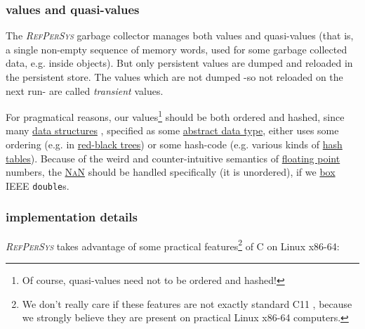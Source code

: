 \documentclass[11pt,a4paper,svgnames]{article}
\newcommand{\RefPerSys}{{\textit{\textsc{RefPerSys}}}}
\begin{document}
\medskip

\subsubsection{values and quasi-values}
\label{subsubsec:values-quasi}

The {\RefPerSys} garbage collector manages both values and
quasi-values (that is, a single non-empty sequence of memory words,
used for some garbage collected data, e.g. inside objects). But only
persistent values are dumped and reloaded in the persistent store.
The values which are not dumped -so not reloaded on the next run- are
called \emph{transient} values.

  For pragmatical reasons, our values\footnote{Of course, quasi-values
  need not to be ordered and hashed!} should be both ordered and
  hashed, since many
  \href{https://en.wikipedia.org/wiki/Data\_structure}{data
    structures} \cite{cormen:2009:introduction}, specified as some
  \href{https://en.wikipedia.org/wiki/Abstract_data_type}{abstract
    data type}, either uses some ordering
  (e.g. in \href{https://en.wikipedia.org/wiki/Red-black_tree}{red-black
    trees}) or some hash-code (e.g. various kinds of
  \href{https://en.wikipedia.org/wiki/Hash_table}{hash
    tables}). Because of the weird and counter-intuitive semantics of
  \href{http://floating-point-gui.de}{floating point} numbers, the
  \href{https://en.wikipedia.org/wiki/NaN}{\textsc{NaN}} should be
  handled specifically (it is unordered), if we
  \href{https://en.wikipedia.org/wiki/Object\_type\_(object-oriented\_programming)\#Boxing}{box}
  IEEE \texttt{double}s.


  
  \medskip

\subsubsection{implementation details}
\label{subsubsec:implementation-details}

{\RefPerSys} takes advantage of some practical features\footnote{We
don't really care if these features are not exactly standard C11
\cite{c11-standard:2011}, because we strongly believe they are present
on practical Linux x86-64 computers.} of C on Linux x86-64:
\end{document}

